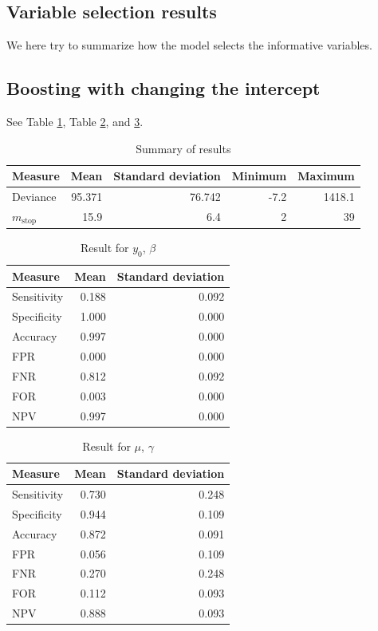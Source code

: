 \subsection{Variable selection results}
We here try to summarize how the model selects the informative variables.

\subsection{Boosting with changing the intercept}
See Table \ref{table:non-correlated-with-intercept-summary}, Table \ref{table:non-correlated-with-intercept-y0}, and \ref{table:non-correlated-with-intercept-mu}.
\begin{table}\caption{Summary of results}\label{table:non-correlated-with-intercept-summary}
\begin{tabular}{l|rrrr}
Measure &   Mean & Standard deviation &  Minimum &    Maximum \\
\hline
Deviance & 95.371 & 76.742 & -7.2 & 1418.1 \\
$m_{\text{stop}}$   & 15.9 &  6.4 &  2 &   39
\end{tabular}
\end{table}

\begin{table}\caption{Result for $y_0$, $\beta$}\label{table:non-correlated-with-intercept-y0}
\begin{tabular}{l|rr}
Measure &  Mean &    Standard deviation \\
\hline
Sensitivity & 0.188 & 0.092 \\
Specificity & 1.000 & 0.000 \\
Accuracy    & 0.997 & 0.000 \\
FPR         & 0.000 & 0.000 \\
FNR         & 0.812 & 0.092 \\
FOR         & 0.003 & 0.000 \\
NPV         & 0.997 & 0.000
\end{tabular}
\end{table}


\begin{table}\caption{Result for $\mu$, $\gamma$}\label{table:non-correlated-with-intercept-mu}
\begin{tabular}{l|rr}
Measure     & Mean   & Standard deviation     \\
\hline
Sensitivity & 0.730 & 0.248 \\
Specificity & 0.944 & 0.109 \\
Accuracy    & 0.872 & 0.091 \\
FPR         & 0.056 & 0.109 \\
FNR         & 0.270 & 0.248 \\
FOR         & 0.112 & 0.093 \\
NPV         & 0.888 & 0.093
\end{tabular}
\end{table}



